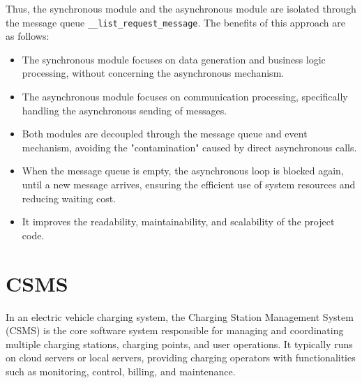 \documentclass[
english,
ruledheaders=section,%
class=report,%
thesis={type=Report},%
accentcolor=9c,%
custommargins=true,%
marginpar=false,%
parskip=half-,%
fontsize=11pt,%
logofile={img/tuda_logo.pdf}, %
]{tudapub}
\begin{document}
    Thus, the synchronous module and the asynchronous module are isolated through the message queue \texttt{\_\_list\_request\_message}. The benefits of this approach are as follows:

    \begin{itemize}
        \item The synchronous module focuses on data generation and business logic processing, without concerning the asynchronous mechanism.
        \item The asynchronous module focuses on communication processing, specifically handling the asynchronous sending of messages.
        \item Both modules are decoupled through the message queue and event mechanism, avoiding the "contamination" caused by direct asynchronous calls.
        \item When the message queue is empty, the asynchronous loop is blocked again, until a new message arrives, ensuring the efficient use of system resources and reducing waiting cost.
        \item It improves the readability, maintainability, and scalability of the project code.
    \end{itemize}

    \chapter{CSMS}
    \label{chap:CSMS}







    In an electric vehicle charging system, the Charging Station Management System (CSMS) is the core software system responsible for managing and coordinating multiple charging stations, charging points, and user operations. It typically runs on cloud servers or local servers, providing charging operators with functionalities such as monitoring, control, billing, and maintenance.\cite{CSMS}
\end{document}
